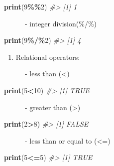 \documentclass[
]{book}
\newenvironment{Shaded}{\begin{snugshade}}{\end{snugshade}}
\newcommand{\CommentTok}[1]{\textcolor[rgb]{0.56,0.35,0.01}{\textit{#1}}}
\newcommand{\DecValTok}[1]{\textcolor[rgb]{0.00,0.00,0.81}{#1}}
\newcommand{\FunctionTok}[1]{\textcolor[rgb]{0.13,0.29,0.53}{\textbf{#1}}}
\newcommand{\NormalTok}[1]{#1}
\newcommand{\SpecialCharTok}[1]{\textcolor[rgb]{0.81,0.36,0.00}{\textbf{#1}}}
\providecommand{\tightlist}{%
  \setlength{\itemsep}{0pt}\setlength{\parskip}{0pt}}
\begin{document}
\begin{Shaded}
\begin{Highlighting}[]
\FunctionTok{print}\NormalTok{(}\DecValTok{9}\SpecialCharTok{\%\%}\DecValTok{2}\NormalTok{)}
\CommentTok{\#\textgreater{} [1] 1}
\end{Highlighting}
\end{Shaded}

~~~~~~- integer division(\%/\%)

\begin{Shaded}
\begin{Highlighting}[]
\FunctionTok{print}\NormalTok{(}\DecValTok{9}\SpecialCharTok{\%/\%}\DecValTok{2}\NormalTok{)}
\CommentTok{\#\textgreater{} [1] 4}
\end{Highlighting}
\end{Shaded}

\begin{enumerate}
\def\labelenumi{\arabic{enumi}.}
\setcounter{enumi}{1}
\tightlist
\item
  Relational operators:
\end{enumerate}

~~~~~~- less than (\textless)

\begin{Shaded}
\begin{Highlighting}[]
\FunctionTok{print}\NormalTok{(}\DecValTok{5}\SpecialCharTok{\textless{}}\DecValTok{10}\NormalTok{)}
\CommentTok{\#\textgreater{} [1] TRUE}
\end{Highlighting}
\end{Shaded}

~~~~~~- greater than (\textgreater)

\begin{Shaded}
\begin{Highlighting}[]
\FunctionTok{print}\NormalTok{(}\DecValTok{2}\SpecialCharTok{\textgreater{}}\DecValTok{8}\NormalTok{)}
\CommentTok{\#\textgreater{} [1] FALSE}
\end{Highlighting}
\end{Shaded}

~~~~~~- less than or equal to (\textless=)

\begin{Shaded}
\begin{Highlighting}[]
\FunctionTok{print}\NormalTok{(}\DecValTok{5}\SpecialCharTok{\textless{}=}\DecValTok{5}\NormalTok{)}
\CommentTok{\#\textgreater{} [1] TRUE}
\end{Highlighting}
\end{Shaded}
\end{document}
